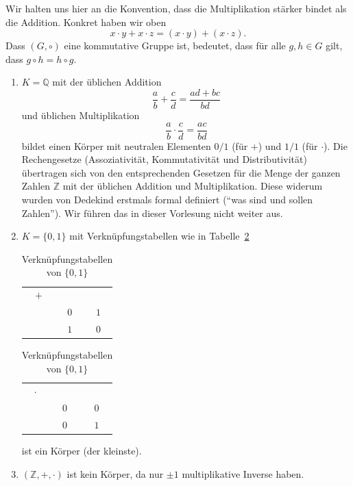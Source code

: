 \documentclass[../main.tex]{subfiles}
\begin{document}
Wir halten uns hier an die Konvention, dass die Multiplikation stärker
bindet als die Addition. Konkret haben wir oben
\[ x \cdot y + x \cdot z = (x \cdot y) + (x \cdot z).\]
Dass $(G, \circ)$ eine kommutative Gruppe ist, bedeutet,
dass für alle $g, h \in G$ gilt, dass $g \circ h = h \circ g$.

\begin{examples}
  \leavevmode
  \begin{enumerate}[(1)]
    \item $K = \mathbb Q$ mit der üblichen Addition
      \[ \frac{a}{b} + \frac{c}{d} = \frac{ad + bc}{bd}\]
      und üblichen Multiplikation
      \[ \frac{a}{b} \cdot \frac{c}{d} = \frac{ac}{bd}\]
      bildet einen Körper mit neutralen Elementen $0/1$ (für $+$) und $1/1$ (für $\cdot$).
      Die Rechengesetze (Assoziativität, Kommutativität und Distributivität) übertragen
      sich von den entsprechenden Gesetzen für die Menge der ganzen Zahlen $\mathbb Z$
      mit der üblichen Addition und Multiplikation.
      Diese widerum wurden von Dedekind erstmals formal definiert (``was
      sind und sollen Zahlen'').
      Wir
      führen das in dieser Vorlesung nicht weiter aus.
    \item $K = \{0, 1\}$ mit Verknüpfungstabellen
      wie in Tabelle~\ref{tab:01}
      \begin{table}[h]
        \centering
        \begin{minipage}{0.25\linewidth}
          \centering
        \begin{tabular}[h]{ccc}
         $+$ & \color{gray}{$0$} & \color{gray}{$1$}\\
        \color{gray}{$0$} & $0$ & $1$ \\
        \color{gray}{$1$} & $1$ & $0$
        \end{tabular}%
        \end{minipage}%
        \begin{minipage}{0.25\linewidth}
          \centering
        \begin{tabular}[h]{ccc}
          $\cdot$ & \color{gray}{$0$} & \color{gray}{$1$} \\
          \color{gray}{$0$} & $0$ & $0$ \\
          \color{gray}{$1$} & $0$ & $1$
        \end{tabular}
      \end{minipage}
      \caption{Verknüpfungstabellen von $\{0, 1\}$}%
      \label{tab:01}
      \end{table}
      ist ein Körper (der kleinste).
    \item $(\mathbb Z, + , \cdot)$ ist kein Körper, da nur $\pm 1$ multiplikative
      Inverse haben.
  \end{enumerate}
\end{examples}
\end{document}
